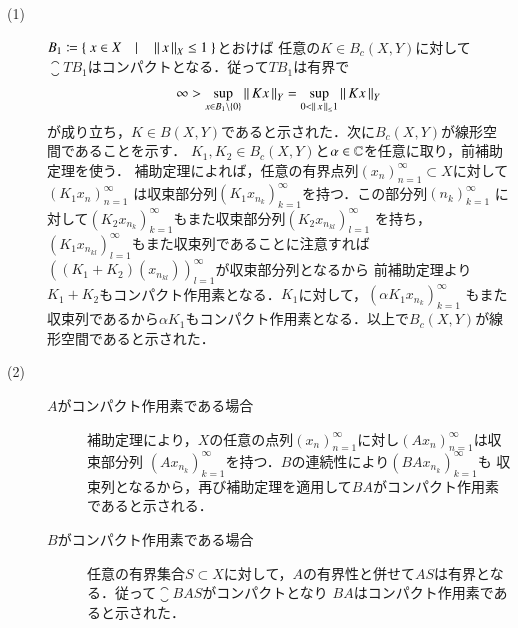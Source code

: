 	\begin{prf}\mbox{}
		\begin{description}
			\item[(1)] $B_1 \coloneqq \left\{\ x \in X \quad |\quad \left\|\, x\, \right\|_{X} \leq 1\ \right\}$とおけば
				任意の$K \in B_c(X,Y)$に対して$\closure{TB_1}$はコンパクトとなる．従って$TB_1$は有界で
				\begin{align}
					\infty > \operatorname*{sup}_{x \in B_1 \backslash \{0\}} \left\|\, Kx\, \right\|_{Y} = \operatorname*{sup}_{0 < \left\|\, x\, \right\|_{\leq} 1} \left\|\, Kx\, \right\|_{Y}
				\end{align}
				が成り立ち，$K \in B(X,Y)$であると示された．次に$B_c(X,Y)$が線形空間であることを示す．
				$K_1, K_2 \in B_c(X,Y)$と$\alpha \in \mathbb{C}$を任意に取り，前補助定理を使う．
				補助定理によれば，任意の有界点列$(x_n)_{n=1}^{\infty} \subset X$に対して$(K_1x_n)_{n=1}^{\infty}$
				は収束部分列$(K_1x_{n_k})_{k=1}^{\infty}$を持つ．この部分列$(n_k)_{k=1}^{\infty}$
				に対して$(K_2x_{n_k})_{k=1}^{\infty}$もまた収束部分列$(K_2x_{n_{kl}})_{l=1}^{\infty}$
				を持ち，$(K_1x_{n_{kl}})_{l=1}^{\infty}$もまた収束列であることに注意すれば
				$\left( (K_1 + K_2)(x_{n_{kl}}) \right)_{l=1}^{\infty}$が収束部分列となるから
				前補助定理より$K_1 + K_2$もコンパクト作用素となる．$K_1$に対して，$(\alpha K_1x_{n_k})_{k=1}^{\infty}$
				もまた収束列であるから$\alpha K_1$もコンパクト作用素となる．以上で$B_c(X,Y)$が線形空間であると示された．
			
			\item[(2)]\mbox{}
				\begin{description}
					\item[$A$がコンパクト作用素である場合]
						補助定理により，$X$の任意の点列$(x_n)_{n=1}^{\infty}$に対し$(Ax_n)_{n=1}^{\infty}$は収束部分列
						$(Ax_{n_k})_{k=1}^{\infty}$を持つ．$B$の連続性により$(BAx_{n_k})_{k=1}^{\infty}$も
						収束列となるから，再び補助定理を適用して$BA$がコンパクト作用素であると示される．
					
					\item[$B$がコンパクト作用素である場合]
						任意の有界集合$S \subset X$に対して，$A$の有界性と併せて$AS$は有界となる．従って$\closure{BAS}$がコンパクトとなり
						$BA$はコンパクト作用素であると示された．
				\end{description}
		\end{description}
		\QED
	\end{prf}
